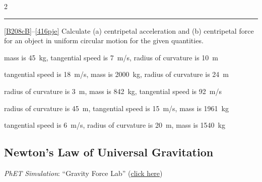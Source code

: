 \documentclass[main.tex]{subfiles}
\begin{document}
\begin{multicols}{2}
{\color{cyan} \hrule}
\vspace{2ex}

\ref{B208cB}--\ref{416pje} Calculate (a) centripetal acceleration and (b) centripetal force for an object in uniform circular motion for the given quantities.

\begin{exercise} \label{B208cB}
mass is \SI{45}{kg}, tangential speed is \SI{7}{m/s}, radius of curvature is \SI{10}{m}
\end{exercise}

\begin{exercise}
tangential speed is \SI{18}{m/s}, mass is \SI{2000}{kg}, radius of curvature is \SI{24}{m}
\end{exercise}

\begin{exercise}
radius of curvature is \SI{3}{m}, mass is \SI{842}{kg}, tangential speed is \SI{92}{m/s}
\end{exercise}

\begin{exercise}
radius of curvature is \SI{45}{m}, tangential speed is \SI{15}{m/s}, mass is \SI{1961}{kg}
\end{exercise}

\begin{exercise}\label{416pje}
tangential speed is \SI{6}{m/s}, radius of curvature is \SI{20}{m}, mass is \SI{1540}{kg}
\end{exercise}


\end{multicols}



\clearpage

\subsection{Newton's Law of Universal Gravitation}

 \textit{PhET Simulation}: ``Gravity Force Lab'' (\href{https://phet.colorado.edu/sims/html/gravity-force-lab/latest/gravity-force-lab_en.html}{click here})
\end{document}
